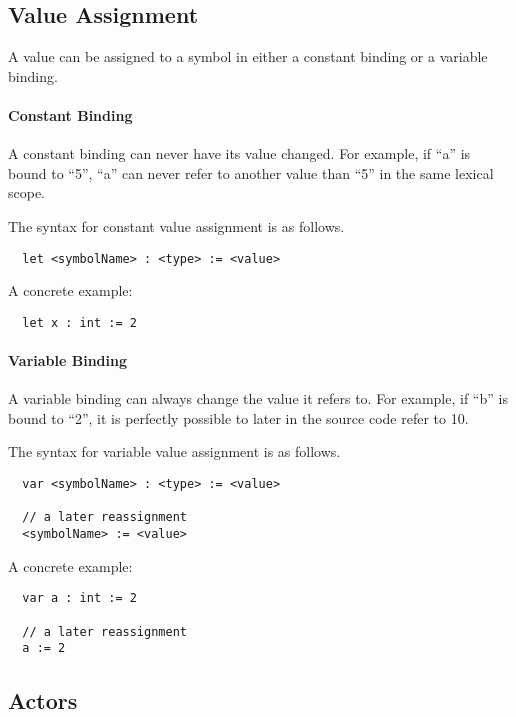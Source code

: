 \subsection{Value Assignment}
\label{sec:value_assignment}

A value can be assigned to a symbol in either a constant binding or a variable binding. 

\paragraph{Constant Binding}

A constant binding can never have its value changed. For example, if \enquote{a} is bound to \enquote{5}, \enquote{a} can never refer to another value than \enquote{5} in the same lexical scope.

The syntax for constant value assignment is as follows.
\begin{verbatim}
  let <symbolName> : <type> := <value>
\end{verbatim}

A concrete example:

\begin{verbatim}
  let x : int := 2
\end{verbatim}

\paragraph{Variable Binding}

A variable binding can always change the value it refers to. For example, if \enquote{b} is bound to \enquote{2}, it is perfectly possible to later in the source code refer to {10}.

The syntax for variable value assignment is as follows.
\begin{verbatim}
  var <symbolName> : <type> := <value>

  // a later reassignment
  <symbolName> := <value>
\end{verbatim}

A concrete example:

\begin{verbatim}
  var a : int := 2
  
  // a later reassignment
  a := 2
\end{verbatim}

\subsection{Actors}
\label{sub:actors}

